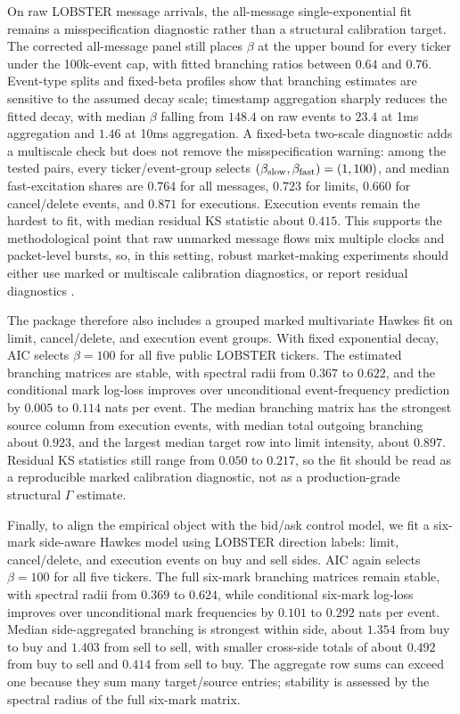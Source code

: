 \documentclass[11pt]{article}
\begin{document}
On raw LOBSTER message arrivals, the all-message single-exponential fit remains
a misspecification diagnostic rather than a structural calibration target. The
corrected all-message panel still places $\beta$ at the upper
bound for every ticker under the 100k-event cap, with fitted branching ratios
between $0.64$ and $0.76$. Event-type splits and fixed-beta profiles show that
branching estimates are sensitive to the assumed decay scale; timestamp
aggregation sharply reduces the fitted decay, with median $\beta$ falling from
$148.4$ on raw events to $23.4$ at 1ms aggregation and $1.46$ at 10ms
aggregation. A fixed-beta two-scale diagnostic adds a multiscale check
but does not remove the misspecification warning: among the tested pairs, every
ticker/event-group selects $(\beta_{\rm slow},\beta_{\rm fast})=(1,100)$, and
median fast-excitation shares are $0.764$ for all messages, $0.723$ for limits,
$0.660$ for cancel/delete events, and $0.871$ for executions. Execution events
remain the hardest to fit, with median residual KS statistic about $0.415$.
This supports the methodological point that raw unmarked message flows mix
multiple clocks and packet-level bursts, so, in this setting, robust
market-making experiments should either use marked or multiscale calibration
diagnostics, or report residual diagnostics
\cite{BacryMuzy2015,Ogata1988}.

The package therefore also includes a grouped marked multivariate Hawkes fit on
limit, cancel/delete, and execution event groups. With fixed exponential decay,
AIC selects $\beta=100$ for all five public LOBSTER tickers. The estimated
branching matrices are stable, with spectral radii from $0.367$ to $0.622$,
and the conditional mark log-loss improves over unconditional event-frequency
prediction by $0.005$ to $0.114$ nats per event. The median branching matrix
has the strongest source column from execution events, with median total
outgoing branching about $0.923$, and the largest median target row into limit
intensity, about $0.897$. Residual KS statistics still range from $0.050$ to
$0.217$, so the fit should be read as a reproducible marked calibration
diagnostic, not as a production-grade structural $\Gamma$ estimate.

Finally, to align the empirical object with the bid/ask control model, we fit a
six-mark side-aware Hawkes model using LOBSTER direction labels: limit,
cancel/delete, and execution events on buy and sell sides. AIC again selects
$\beta=100$ for all five tickers. The full six-mark branching matrices remain
stable, with spectral radii from $0.369$ to $0.624$, while conditional
six-mark log-loss improves over unconditional mark frequencies by $0.101$ to
$0.292$ nats per event. Median side-aggregated branching is strongest within
side, about $1.354$ from buy to buy and $1.403$ from sell to sell, with smaller
cross-side totals of about $0.492$ from buy to sell and $0.414$ from sell to
buy. The aggregate row sums can exceed one because they sum many target/source
entries; stability is assessed by the spectral radius of the full six-mark
matrix.
\end{document}
